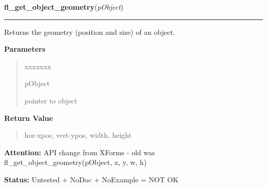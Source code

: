 \hspace{.8\funcindent}\begin{boxedminipage}{\funcwidth}

    \raggedright \textbf{fl\_get\_object\_geometry}(\textit{pObject})

    \vspace{-1.5ex}

    \rule{\textwidth}{0.5\fboxrule}
\setlength{\parskip}{2ex}
    Returns the geometry (position and size) of an object.

\setlength{\parskip}{1ex}
      \textbf{Parameters}
      \vspace{-1ex}

      \begin{quote}
        \begin{Ventry}{xxxxxxx}

          \item[pObject]

          pointer to object

        \end{Ventry}

      \end{quote}

      \textbf{Return Value}
    \vspace{-1ex}

      \begin{quote}
      hor-xpos, vert-ypos, width, height

      \end{quote}

\textbf{Attention:} API change from XForms - old was fl\_get\_object\_geometry(pObject, x, y, 
w, h)



\textbf{Status:} Untested + NoDoc + NoExample = NOT OK



    \end{boxedminipage}

    \label{xformslib:library:fl_get_object_position}

    \vspace{0.5ex}

